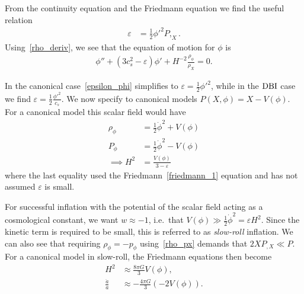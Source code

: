 From the continuity equation and the Friedmann equation
we find the useful relation
\begin{align}\label{epsilon_phi}
    \varepsilon &= \frac{1}{2}{\phi'}^2 P,_{X}.
\end{align}
Using~\eqref{rho_deriv}, we see that
the equation of motion for $\phi$ is~\cite{Hu_2011}
\begin{align}\label{phieom}
    \phi''+(3c_s^2-\varepsilon)\phi'+H^{-2}\frac{\rho_\phi}{\rho_X}=0.
\end{align}


In the canonical case~\eqref{epsilon_phi} simplifies to
$\varepsilon = \frac{1}{2}{\phi'}^2$,
while in the $\text{DBI}$ case we find
$\varepsilon = \frac{1}{2}\frac{{\phi'}^2}{c_s}$.
We now specify to canonical models $P(X,\phi)=X-V(\phi)$.
    For a canonical model this scalar field would have
    \begin{align}
        \rho_\phi &= \frac{1}{2}\dot{\phi}^2+V(\phi)\\
        P_\phi &= \frac{1}{2}\dot{\phi}^2-V(\phi)\\
        \implies H^2 &= \frac{V(\phi)}{3-\varepsilon}
    \end{align}
    where the last equality used the Friedmann~\eqref{friedmann_1} equation and
    has not assumed $\varepsilon$ is small.


    For successful inflation with the potential of the scalar field acting as a
    cosmological constant, we want $w\approx-1$,
    i.e.\ that $V(\phi)\gg\frac{1}{2}\dot{\phi}^2=\varepsilon H^2$. Since the kinetic term is required to
    be small, this is referred to as \textit{slow-roll} inflation.
We can also see that requiring $\rho_\phi=-p_\phi$ using~\eqref{rho_px} demands that
$2XP_{,X}\ll P$.
    For a canonical model in slow-roll,
    the Friedmann equations then become
    \begin{align}
        H^2 &\approx \frac{8\pi G}{3}V(\phi),\\
        \frac{\ddot{a}}{a} &\approx -\frac{4\pi G}{3}\left(-2V(\phi)\right).
    \end{align}

